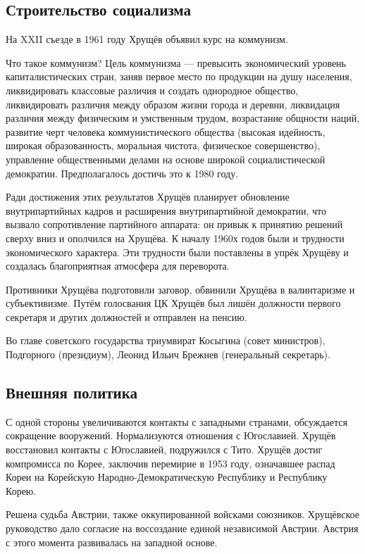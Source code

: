 \documentclass{article}
\begin{document}
\subsection{Строительство социализма}
На XXII съезде в 1961 году Хрущёв объявил курс на коммунизм.

Что такое коммунизм? Цель коммунизма --- превысить экономический уровень капиталистических стран, заняв первое место по продукции на душу населения, ликвидировать классовые различия и создать однородное общество, ликвидировать различия между образом жизни города и деревни, ликвидация различия между физическим и умственным трудом, возрастание общности наций, развитие черт человека коммунистического общества (высокая идейность, широкая образованность, моральная чистота, физическое совершенство), управление общественными делами на основе широкой социалистической демократии. Предполагалось достичь это к 1980 году.

Ради достижения этих результатов Хрущёв планирует обновление внутрипартийных кадров и расширения внутрипартийной демократии, что вызвало сопротивление партийного аппарата: он привык к принятию решений сверху вниз и ополчился на Хрущёва. К началу 1960х годов были и трудности экономического характера. Эти трудности были поставлены в упрёк Хрущёву и создалась благоприятная атмосфера для переворота.

Противники Хрущёва подготовили заговор, обвинили Хрущёва в валинтаризме и субъективизме. Путём голосвания ЦК Хрущёв был лишён должности первого секретаря и других должностей и отправлен на пенсию.

Во главе советского государства триумвират Косыгина (совет министров), Подгорного (президиум), Леонид Ильич Брежнев (генеральный секретарь).

\subsection{Внешняя политика}
С одной стороны увеличиваются контакты с западными странами, обсуждается сокращение вооружений. Нормализуются отношения с Югославией. Хрущёв восстановил контакты с Югославией, подружился с Тито. Хрущёв достиг компромисса по Корее, заключив перемирие в 1953 году, означавшее распад Кореи на Корейскую Народно-Демократическую Республику и Республику Корею.

Решена судьба Австрии, также оккупированной войсками союзников. Хрущёвское руководство дало согласие на воссоздание единой независимой Австрии. Австрия с этого момента развивалась на западной основе.
\end{document}
